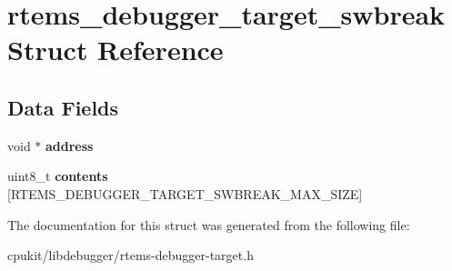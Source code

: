 \hypertarget{structrtems__debugger__target__swbreak}{}\section{rtems\+\_\+debugger\+\_\+target\+\_\+swbreak Struct Reference}
\label{structrtems__debugger__target__swbreak}
\subsection*{Data Fields}
\begin{DoxyCompactItemize}
\item 
\mbox{\label{structrtems__debugger__target__swbreak_a35520f7ee920dcb83d960e694ccfc134}} 
void $\ast$ {\bfseries address}
\item 
\mbox{\label{structrtems__debugger__target__swbreak_ae05849bf4ddb7bec24b88f62c3998436}} 
uint8\+\_\+t {\bfseries contents} \mbox{[}R\+T\+E\+M\+S\+\_\+\+D\+E\+B\+U\+G\+G\+E\+R\+\_\+\+T\+A\+R\+G\+E\+T\+\_\+\+S\+W\+B\+R\+E\+A\+K\+\_\+\+M\+A\+X\+\_\+\+S\+I\+ZE\mbox{]}
\end{DoxyCompactItemize}


The documentation for this struct was generated from the following file\+:\begin{DoxyCompactItemize}
\item 
cpukit/libdebugger/rtems-\/debugger-\/target.\+h\end{DoxyCompactItemize}
